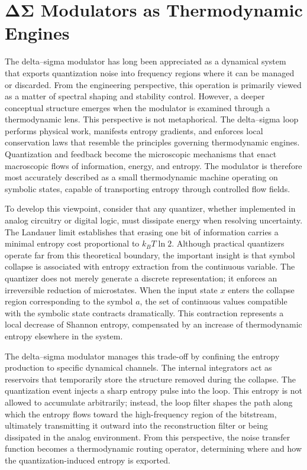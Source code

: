 
\chapter{ΔΣ Modulators as Thermodynamic Engines}

The delta–sigma modulator has long been appreciated as a dynamical system that exports quantization noise into frequency regions where it can be managed or discarded. From the engineering perspective, this operation is primarily viewed as a matter of spectral shaping and stability control. However, a deeper conceptual structure emerges when the modulator is examined through a thermodynamic lens. This perspective is not metaphorical. The delta–sigma loop performs physical work, manifests entropy gradients, and enforces local conservation laws that resemble the principles governing thermodynamic engines. Quantization and feedback become the microscopic mechanisms that enact macroscopic flows of information, energy, and entropy. The modulator is therefore most accurately described as a small thermodynamic machine operating on symbolic states, capable of transporting entropy through controlled flow fields.

To develop this viewpoint, consider that any quantizer, whether implemented in analog circuitry or digital logic, must dissipate energy when resolving uncertainty. The Landauer limit establishes that erasing one bit of information carries a minimal entropy cost proportional to \(k_B T \ln 2\). Although practical quantizers operate far from this theoretical boundary, the important insight is that symbol collapse is associated with entropy extraction from the continuous variable. The quantizer does not merely generate a discrete representation; it enforces an irreversible reduction of microstates. When the input state \(x\) enters the collapse region corresponding to the symbol \(a\), the set of continuous values compatible with the symbolic state contracts dramatically. This contraction represents a local decrease of Shannon entropy, compensated by an increase of thermodynamic entropy elsewhere in the system.

The delta–sigma modulator manages this trade-off by confining the entropy production to specific dynamical channels. The internal integrators act as reservoirs that temporarily store the structure removed during the collapse. The quantization event injects a sharp entropy pulse into the loop. This entropy is not allowed to accumulate arbitrarily; instead, the loop filter shapes the path along which the entropy flows toward the high-frequency region of the bitstream, ultimately transmitting it outward into the reconstruction filter or being dissipated in the analog environment. From this perspective, the noise transfer function becomes a thermodynamic routing operator, determining where and how the quantization-induced entropy is exported.

